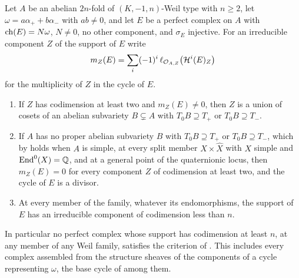 \begin{theorem}
\label{thm:p2support}
Let $A$ be an abelian $2n$-fold of $(K,-1,n)$-Weil type with $n\ge2$, let
$\omega=a\alpha_{+}+b\alpha_{-}$ with $ab\ne0$, and let $E$ be a perfect
complex on $A$ with $\operatorname{ch}(E)=N\omega$, $N\ne0$, no other component, and
$\sigma_{E}$ injective. For an irreducible component $Z$ of the support of $E$
write
\[
  m_{Z}(E)=\sum_{i}(-1)^{i}\,\ell_{\mathcal{O}_{A,Z}}\bigl(\mathcal{H}^{i}(E)_{Z}\bigr)
\]
for the multiplicity of $Z$ in the cycle of $E$.
\begin{enumerate}[label=\textup{(\roman*)},leftmargin=2.6em,itemsep=2pt]
\item If $Z$ has codimension at least two and $m_{Z}(E)\ne0$, then $Z$ is a
  union of cosets of an abelian subvariety $B\subsetneq A$ with
  $T_{0}B\supseteq T_{+}$ or $T_{0}B\supseteq T_{-}$.
\item If $A$ has no proper abelian subvariety $B$ with $T_{0}B\supseteq T_{+}$
  or $T_{0}B\supseteq T_{-}$, which by  holds when $A$ is
  simple, at every split member $X\times\widehat X$ with $X$ simple and
  $\operatorname{End}^{0}(X)=\mathbb{Q}$, and at a general point of the quaternionic locus, then
  $m_{Z}(E)=0$ for every component $Z$ of codimension at least two, and the
  cycle of $E$ is a divisor.
\item At every member of the family, whatever its endomorphisms, the support
  of $E$ has an irreducible component of codimension less than $n$.
\end{enumerate}
In particular no perfect complex whose support has codimension at least $n$,
at any member of any Weil family, satisfies the criterion of
. This includes every complex assembled from the
structure sheaves of the components of a cycle representing $\omega$, the base
cycle of  among them.
\end{theorem}


